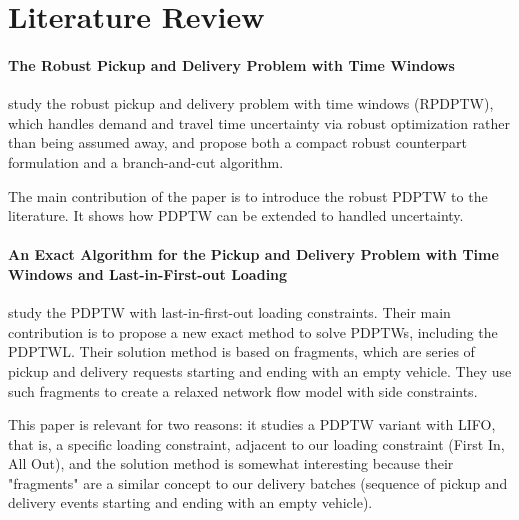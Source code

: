 \documentclass[preprint,11pt,authoryear]{elsarticle}
\begin{document}


\section{Literature Review}

\paragraph{\textbf{The Robust Pickup and Delivery Problem with Time Windows}}

\citet{abreuRobustPickupDelivery2026} study the robust pickup and delivery
problem with time windows (RPDPTW), which handles demand and travel time uncertainty via robust
optimization rather than being assumed away, and propose both a compact robust counterpart formulation and a branch-and-cut algorithm.

The main contribution of the paper is to introduce the robust PDPTW to the literature.
It shows how PDPTW can be extended to handled uncertainty.


\paragraph{\textbf{An Exact Algorithm for the Pickup and Delivery Problem with Time Windows and Last-in-First-out Loading}}

\citet{alyasiryExactAlgorithmPickup2019} study the PDPTW with last-in-first-out loading constraints. 
Their main contribution is to propose a new exact method to solve PDPTWs, including the PDPTWL. Their solution method is based on 
fragments, which are series of pickup and delivery requests starting and ending with an empty vehicle. They use such fragments to 
create a relaxed network flow model with side constraints.

This paper is relevant for two reasons: it studies a PDPTW variant with LIFO, that is, a specific loading constraint, adjacent to our 
loading constraint (First In, All Out), and the solution method is somewhat interesting because their "fragments" are a similar concept to our 
delivery batches (sequence of pickup and delivery events starting and ending with an empty vehicle).
\end{document}
